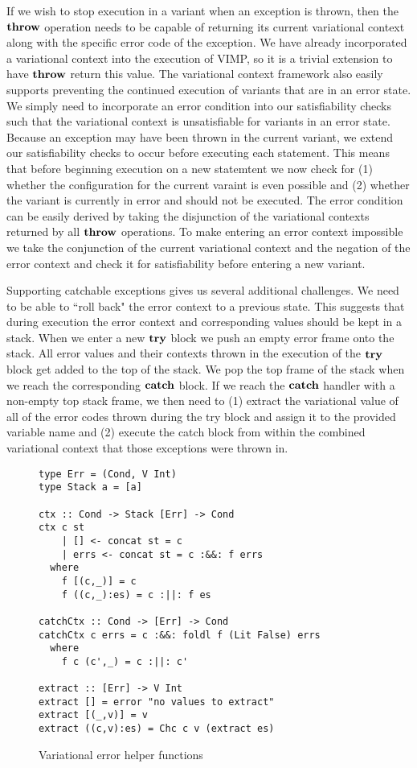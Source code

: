 \documentclass[12pt,oneside]{book}
\begin{document}
If we wish to stop execution in a variant when an exception is thrown, then the $\textbf{\textup{\textrm{throw}}}$ operation needs to be capable of returning its current variational context
along with the specific error code of the exception. We have already incorporated a variational context into the execution of VIMP, so it is a trivial extension to have $\textbf{\textup{\textrm{throw}}}$
return this value. The variational
context framework also easily supports preventing the continued execution of variants that are in an error state. We simply need to incorporate an error condition into our
satisfiability checks such that the variational context is unsatisfiable for variants in an error state. Because an exception may have been thrown in the current variant, we extend
our satisfiability checks to occur before executing each statement. This means that before beginning execution on a new statemtent we now check
for (1) whether the configuration for the current varaint is even possible and (2) whether the variant is currently in error and should not be executed. The error condition can be easily derived
by taking the disjunction of the variational contexts returned by all $\textbf{\textup{\textrm{throw}}}$ operations. To make entering an error context impossible we take the conjunction of
the current variational context and the negation of the error context and check it for satisfiability before entering a new variant.

Supporting catchable exceptions gives us several additional challenges. We need to be able to ``roll back" the error context to a previous state. This suggests that
during execution the error context and corresponding values should be kept in a stack. When we enter a new $\textbf{\textup{\textrm{try}}}$ block we push an empty error frame onto
the stack. All error values and their contexts thrown in the execution of the $\textbf{\textup{\textrm{try}}}$ block get added to the top of the stack. We pop the top frame of the stack when
we reach the corresponding $\textbf{\textup{\textrm{catch}}}$ block. If we reach the $\textbf{\textup{\textrm{catch}}}$ handler with
a non-empty top stack frame, we then need to (1) extract the variational value of all of the error codes thrown during the try block and assign it to the provided variable name and (2) execute the catch block from within the
combined variational context that those exceptions were thrown in.

\begin{figure}
\begin{lstlisting}
type Err = (Cond, V Int)
type Stack a = [a]

ctx :: Cond -> Stack [Err] -> Cond
ctx c st
    | [] <- concat st = c
    | errs <- concat st = c :&&: f errs
  where
    f [(c,_)] = c
    f ((c,_):es) = c :||: f es
    
catchCtx :: Cond -> [Err] -> Cond
catchCtx c errs = c :&&: foldl f (Lit False) errs
  where
    f c (c',_) = c :||: c'
    
extract :: [Err] -> V Int
extract [] = error "no values to extract"
extract [(_,v)] = v
extract ((c,v):es) = Chc c v (extract es)
\end{lstlisting}
\caption{Variational error helper functions}
\label{fig:errhelpers}
\end{figure}
\end{document}
